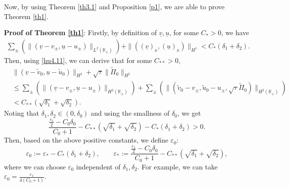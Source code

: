\documentclass[10pt,reqno]{amsart}
\numberwithin{equation}{section}
\begin{document}
Now, by using Theorem \ref{th3.1} and Proposition \ref{p1}, we are able to prove Theorem \ref{th1}.

{\bf{Proof of Theorem \ref{th1}}}:   Firstly, by definition of $\underline v, \underline u$, for some $C_\ast>0$, we have
\begin{align}\label{new-hu1-1}
\sum\limits_{\pm}\left(\|(\underline{v}-v_{\pm},\underline{u}-u_{\pm})\|_{L^2(\mathbb{R}_{\pm})}\right)
+\|((\underline{v})_x,(\underline{u})_x)\|_{H^1}<C_\ast(\delta_1+\delta_2).
\end{align}
Then, using \eqref{hu4.11}, we can derive that for some $C_{\ast\ast}>0$,
\begin{equation}\label{hu4.11-2}
\begin{aligned}
&\|(\underline{v}-\widetilde{v}_0,\underline{u}-\widetilde{u}_0)\|_{H^2}
+\sqrt{\tau}\|\widetilde{\Pi}_0\|_{H^2}\\
&\le
\sum\limits_{\pm}\left(\|(\underline{v}-v_{\pm},\underline{u}-u_{\pm})\|_{H^2(\mathbb{R}_{\pm})}\right)
+\sum\limits_{\pm}\left(\|(\widetilde v_0-v_{\pm},\widetilde u_0-u_{\pm}, \sqrt{\tau}\widetilde \Pi_0)\|_{H^2(\mathbb{R}_{\pm})}\right)
\\
&<C_{\ast\ast}(\sqrt{\delta_1}+\sqrt{\delta_2}).
\end{aligned}
\end{equation}
Noting that $\delta_1, \delta_2\in(0, \delta_0)$ and using the smallness of $\delta_0$, we get
\begin{equation}\label{36.1}
\frac{\frac{\varepsilon_1}{2}-C_0\delta_0}{C_0+1}-C_{\ast\ast}(\sqrt{\delta_1}+\sqrt{\delta_2})
-C_{\ast}(\delta_1+\delta_2)>0.
\end{equation}
Then, based on the above positive constants, we define $\varepsilon_0$:
\[
\varepsilon_0:=\varepsilon_\ast-C_\ast(\delta_1+\delta_2),\qquad
\varepsilon_\ast:=\frac{\frac{\varepsilon_1}{2}-C_0\delta_0}{C_0+1}-C_{\ast\ast}(\sqrt{\delta_1}+\sqrt{\delta_2}),
\]
where we can choose $\varepsilon_0$ independent of $\delta_1, \delta_2$. For example, we can take $\varepsilon_0=\frac{\varepsilon_1}{4 (C_0+1)}$.
\end{document}
